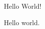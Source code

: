\documentclass{minimal}
\begin{document}
Hello World!

\begin{x}
  \begin{y}
    Hello world.
  \end{y}
\end{x}
\end{document}
